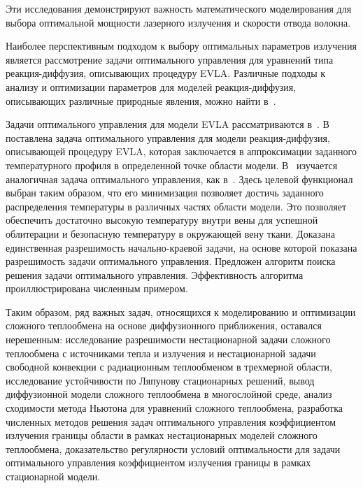Эти исследования демонстрируют важность математического моделирования
для выбора оптимальной мощности лазерного излучения и скорости отвода волокна.

Наиболее перспективным подходом к выбору оптимальных параметров
излучения является рассмотрение задачи оптимального управления
для уравнений типа реакция-диффузия, описывающих процедуру EVLA\@.
Различные подходы к анализу и оптимизации параметров для моделей реакция-диффузия,
описывающих различные природные явления, можно найти в~\cite{
Stability_Alekseev2016, Optimization_Brizitskii2018,
chebotarev2018inverse, Theoretical_Maslovskaya2021,
}.

Задачи оптимального управления для модели EVLA рассматриваются в~\cite{
    Optimal_Kovtanyuk2020, Inverse_Kovtanyuk2021}.
В~\cite{Optimal_Kovtanyuk2020} поставлена задача оптимального управления для модели реакция-диффузия,
описывающей процедуру EVLA, которая заключается в аппроксимации заданного
температурного профиля в определенной точке области модели.
В~\cite{Inverse_Kovtanyuk2021} изучается аналогичная задача оптимального управления,
как в~\cite{Optimal_Kovtanyuk2020}.
Здесь целевой функционал выбран таким образом, что его минимизация позволяет
достичь заданного распределения температуры в различных частях области модели.
Это позволяет обеспечить достаточно высокую температуру внутри
вены для успешной облитерации и безопасную температуру в окружающей вену ткани.
Доказана единственная разрешимость начально-краевой задачи,
на основе которой показана разрешимость задачи оптимального управления.
Предложен алгоритм поиска решения задачи оптимального управления.
Эффективность алгоритма проиллюстрирована численным примером.



Таким образом, ряд важных задач, относящихся к моделированию и
оптимизации сложного теплообмена на основе
диффузионного приближения, оставался нерешенным: исследование
разрешимости нестационарной задачи сложного
теплообмена с источниками тепла и излучения и нестационарной задачи
свободной конвекции с радиационным теплообменом в трехмерной
области, исследование устойчивости по Ляпунову стационарных решений,
вывод диффузионной модели сложного теплообмена в многослойной среде,
анализ сходимости метода Ньютона
для уравнений сложного теплообмена, разработка численных
методов решения задач оптимального управления
коэффициентом излучения границы области в рамках нестационарных моделей
сложного теплообмена, доказательство регулярности
условий оптимальности для задачи оптимального управления коэффициентом
излучения границы в рамках стационарной модели.

